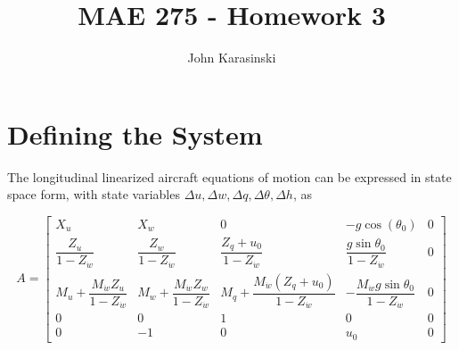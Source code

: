 \documentclass[12pt]{article}
\title{MAE 275 - Homework 3}
\author{John Karasinski}
\begin{document}
\maketitle

\section{Defining the System}
The longitudinal linearized aircraft equations of motion can be expressed in state space form, with state variables $\Delta u, \Delta w, \Delta q, \Delta \theta, \Delta h $, as

\begin{equation*}
A =
\begin{bmatrix}
    X_u & X_w & 0 & -g \cos(\theta_0) & 0 \\
    \dfrac{Z_u}{1-Z_{\dot{w}}} & \dfrac{Z_w}{1-Z_{\dot{w}}} & \dfrac{Z_q + u_0}{1-Z_{\dot{w}}} & \dfrac{g\sin \theta_0}{1-Z_{\dot{w}}} & 0 \\
    M_u + \dfrac{M_{\dot{w}} Z_u}{1-Z_{\dot{w}}} & M_w + \dfrac{M_{\dot{w}} Z_w}{1-Z_{\dot{w}}} & M_q + \dfrac{M_{\dot{w}} (Z_q + u_0)}{1-Z_{\dot{w}}} & -\dfrac{M_{\dot{w}} g\sin \theta_0}{1-Z_{\dot{w}}} & 0 \\
    0 & 0 & 1 & 0 & 0 \\
    0 & -1 & 0 & u_0 & 0
\end{bmatrix}
\end{equation*}
\end{document}
